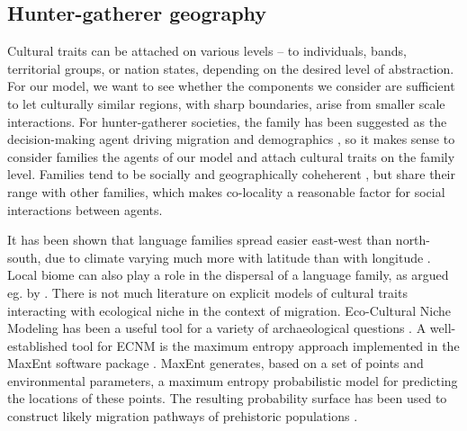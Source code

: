 \documentclass[a4paper,12pt]{scrartcl}
\begin{document}
\subsection{Hunter-gatherer geography}
\label{s:geography}
Cultural traits can be attached on various levels – to individuals, bands,
territorial groups, or nation states, depending on the desired level of
abstraction. For our model, we want to see whether the components we consider
are sufficient to let culturally similar regions, with sharp boundaries, arise
from smaller scale interactions. For hunter-gatherer societies, the family has
been suggested as the decision-making agent driving migration and demographics
\textcite{}, so it makes sense to consider families the agents of our model and
attach cultural traits on the family level. Families tend to be socially and
geographically coheherent \textcite{}, but share their range with other
families, which makes co-locality a reasonable factor for social interactions
between agents.

It has been shown that language families spread easier east-west than
north-south, due to climate varying much more with latitude than with longitude
\parencite{}. Local biome can also play a role in the dispersal of a language
family, as argued eg. by \textcite{grollemund2015bantu,ehret2015bantu}. There is
not much literature on explicit models of cultural traits interacting with
ecological niche in the context of migration. Eco-Cultural Niche Modeling
\parencite[ECNM]{banks2006ecocultural} has been a useful tool for a variety of
archaeological questions
\cite{banks2008human,banks2013ecological,dalpoimguedes2014modeling,kondo2018ecological,walker2019persistence}.
A well-established tool for ECNM is the maximum entropy approach implemented in
the MaxEnt software package
\cite{phillips2006maximum,phillips2008modeling,maxenttutorial}. MaxEnt
generates, based on a set of points and environmental parameters, a maximum
entropy probabilistic model for predicting the locations of these points. The
resulting probability surface has been used to construct likely migration
pathways of prehistoric populations \cite{kondo2018ecological}.
\end{document}
